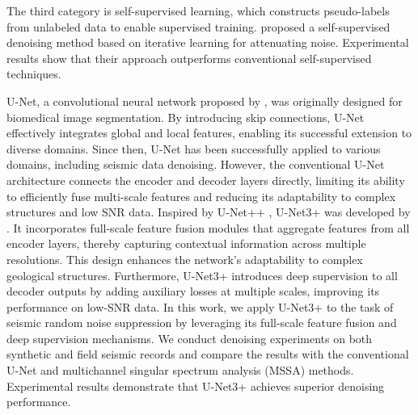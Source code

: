 \documentclass[preprint,12pt,authoryear]{elsarticle}
\begin{document}
The third category is self-supervised learning, which constructs pseudo-labels from unlabeled data to enable supervised training. \citet{cheng2024selfsupervised} proposed a self-supervised denoising method based on iterative learning for attenuating noise. Experimental results show that their approach outperforms conventional self-supervised techniques.

U-Net, a convolutional neural network proposed by \citet{Ronneberger2015}, was originally designed for biomedical image segmentation. By introducing skip connections, U-Net effectively integrates global and local features, enabling its successful extension to diverse domains. Since then, U-Net has been successfully applied to various domains, including seismic data denoising. However, the conventional U-Net architecture connects the encoder and decoder layers directly, limiting its ability to efficiently fuse multi-scale features and reducing its adaptability to complex structures and low SNR data. Inspired by U-Net++ \citep{zhou2020unetplusplus}, U-Net3+ was developed by \citet{huang2020unet3plus}. It incorporates full-scale feature fusion modules that aggregate features from all encoder layers, thereby capturing contextual information across multiple resolutions. This design enhances the network's adaptability to complex geological structures. Furthermore, U-Net3+ introduces deep supervision to all decoder outputs by adding auxiliary losses at multiple scales, improving its performance on low-SNR data.
In this work, we apply U-Net3+ to the task of seismic random noise suppression by leveraging its full-scale feature fusion and deep supervision mechanisms. We conduct denoising experiments on both synthetic and field seismic records and compare the results with  the conventional U-Net and multichannel singular spectrum analysis (MSSA) methods. Experimental results demonstrate that U-Net3+ achieves superior denoising performance.
\end{document}
